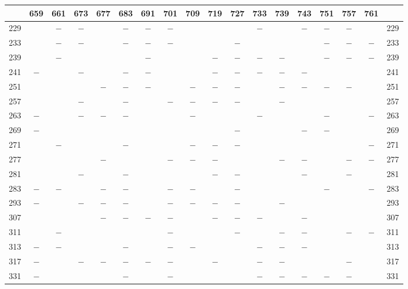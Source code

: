 \begin{center}\begingroup\fontsize{8}{10.5}\selectfont\setlength{\tabcolsep}{2pt}
\begin{tabular}{r|c|c|c|c|c|c|c|c|c|c|c|c|c|c|c|c|r}
\hline
 & 659 & 661 & 673 & 677 & 683 & 691 & 701 & 709 & 719 & 727 & 733 & 739 & 743 & 751 & 757 & 761 & \\
\hline
229 &  & $-$ & $-$ &  & $-$ & $-$ & $-$ &  &  &  & $-$ &  & $-$ & $-$ & $-$ &  & 229\\
233 &  & $-$ & $-$ &  & $-$ & $-$ & $-$ &  &  & $-$ &  &  &  & $-$ & $-$ & $-$ & 233\\
239 &  & $-$ &  &  &  & $-$ &  &  & $-$ & $-$ & $-$ & $-$ &  & $-$ & $-$ & $-$ & 239\\
241 & $-$ &  & $-$ &  & $-$ & $-$ &  &  & $-$ & $-$ & $-$ & $-$ & $-$ &  &  &  & 241\\
251 &  &  &  & $-$ & $-$ & $-$ &  & $-$ & $-$ & $-$ &  & $-$ & $-$ & $-$ & $-$ &  & 251\\
257 &  &  & $-$ &  & $-$ &  & $-$ & $-$ & $-$ & $-$ &  & $-$ &  &  &  &  & 257\\
263 & $-$ &  & $-$ & $-$ & $-$ &  &  & $-$ &  &  & $-$ &  &  & $-$ &  & $-$ & 263\\
269 & $-$ &  &  &  &  &  &  &  &  & $-$ &  &  & $-$ & $-$ &  &  & 269\\
271 &  & $-$ &  &  & $-$ &  &  & $-$ & $-$ & $-$ &  &  &  &  &  & $-$ & 271\\
277 &  &  &  & $-$ &  &  & $-$ & $-$ & $-$ &  &  & $-$ & $-$ &  & $-$ & $-$ & 277\\
281 &  &  & $-$ &  & $-$ &  &  &  & $-$ & $-$ &  &  & $-$ &  & $-$ &  & 281\\
283 & $-$ & $-$ &  & $-$ & $-$ &  & $-$ & $-$ &  & $-$ &  &  &  & $-$ &  & $-$ & 283\\
293 & $-$ &  & $-$ & $-$ & $-$ &  & $-$ & $-$ & $-$ & $-$ &  & $-$ &  &  &  &  & 293\\
307 &  &  &  & $-$ & $-$ & $-$ & $-$ &  & $-$ & $-$ & $-$ &  & $-$ &  &  &  & 307\\
311 &  & $-$ &  &  &  &  & $-$ &  &  & $-$ &  & $-$ & $-$ &  & $-$ & $-$ & 311\\
313 & $-$ & $-$ &  &  & $-$ &  & $-$ & $-$ &  &  & $-$ & $-$ & $-$ &  &  &  & 313\\
317 & $-$ &  & $-$ & $-$ & $-$ & $-$ & $-$ &  & $-$ &  & $-$ & $-$ &  &  & $-$ &  & 317\\
331 & $-$ &  &  &  & $-$ &  & $-$ &  &  &  & $-$ & $-$ & $-$ & $-$ & $-$ &  & 331\\

\end{tabular}
\end{center}
